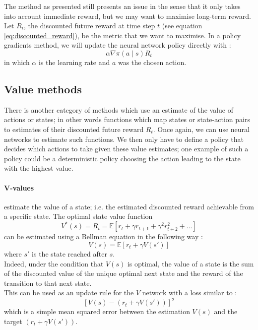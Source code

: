 The method as presented still presents an issue in the sense that it only takes
into account immediate reward, but we may want to maximise long-term reward.
Let $R_t$, the discounted future reward at time step $t$ (see equation 
\ref{eq:discounted_reward}), be the metric
that we want to maximise. In a policy gradients method, we will update the
neural network policy directly with :
\begin{equation}
	\label{eq:policy_update_rule}
	\alpha \nabla \pi(a \mid s) R_t
\end{equation}
in which $\alpha$ is the learning rate and $a$ was the chosen action.

\subsection{Value methods}
There is another category of methods which use an estimate of the value of
actions or states; in other words functions which map states or state-action
pairs to estimates of their discounted future reward $R_t$. Once again, we can
use neural networks to estimate such functions. We then only have to define
a policy that decides which actions to take given these value estimates; one
example of such a policy could be a deterministic policy choosing the action
leading to the state with the highest value.\\

\paragraph{V-values} estimate the value of a state; i.e. the estimated
discounted reward achievable from a specific state.
The optimal state value function 
$$ V^*(s) = R_t = \mathbb{E}
   \left[ r_t + \gamma r_{t+1} + \gamma^2 r_{t+2}^2 + ...  \right]$$
can be estimated using a Bellman equation in the following way :
$$ V(s) = \mathbb{E}\left[ r_t + \gamma V(s')\right]$$
where $s'$ is the state reached after $s$.\\

Indeed, under the condition that $V(s)$ is optimal, the value of a state is the 
sum of the discounted value of the unique optimal next state and the reward of
the transition to that next state.\\

This can be used as an update rule for the $V$ network with a loss similar to :
\begin{equation}
	\label{eq:v_update_rule}
\left[V(s) -  \left(r_t + \gamma V(s') \right)\right]^2 
\end{equation}
\noindent which is a simple mean squared error between the estimation $V(s)$ and
the target $\left(r_t + \gamma V(s') \right)$.

